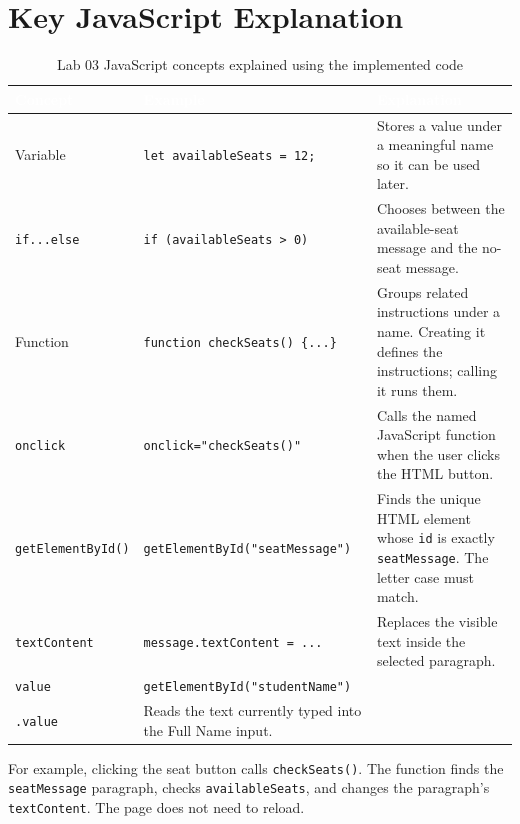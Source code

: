 \documentclass[11pt,a4paper]{article}
\begin{document}
\section{Key JavaScript Explanation}

\begin{table}[H]
    \centering
    \small
    \caption{Lab 03 JavaScript concepts explained using the implemented code}
    \begin{tabularx}{\textwidth}{L{0.19\textwidth}L{0.34\textwidth}Y}
        \toprule
        \textcolor{white}{\textbf{Concept}} & \textcolor{white}{\textbf{Example}} & \textcolor{white}{\textbf{Explanation}} \\
        \midrule
        Variable & \texttt{let availableSeats = 12;} & Stores a value under a meaningful name so it can be used later. \\
        \texttt{if...else} & \texttt{if (availableSeats > 0)} & Chooses between the available-seat message and the no-seat message. \\
        Function & \texttt{function checkSeats() \{...\}} & Groups related instructions under a name. Creating it defines the instructions; calling it runs them. \\
        \texttt{onclick} & \texttt{onclick="checkSeats()"} & Calls the named JavaScript function when the user clicks the HTML button. \\
        \texttt{getElementById()} & \texttt{getElementById("seatMessage")} & Finds the unique HTML element whose \texttt{id} is exactly \texttt{seatMessage}. The letter case must match. \\
        \texttt{textContent} & \texttt{message.textContent = ...} & Replaces the visible text inside the selected paragraph. \\
        \texttt{value} & \texttt{getElementById("studentName")}\\\texttt{.value} & Reads the text currently typed into the Full Name input. \\
        \bottomrule
    \end{tabularx}
\end{table}

For example, clicking the seat button calls \texttt{checkSeats()}. The function finds the \texttt{seatMessage} paragraph, checks \texttt{availableSeats}, and changes the paragraph's \texttt{textContent}. The page does not need to reload.
\end{document}
